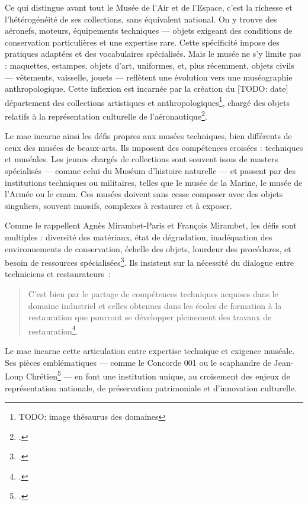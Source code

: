 Ce qui distingue avant tout le Musée de l’Air et de l’Espace, c’est la richesse et l’hétérogénéité de ses collections, sans équivalent national. On y trouve des aéronefs, moteurs, équipements techniques — objets exigeant des conditions de conservation particulières et une expertise rare. Cette spécificité impose des pratiques adaptées et des vocabulaires spécialisés. Mais le musée ne s’y limite pas : maquettes, estampes, objets d’art, uniformes, et, plus récemment, objets civils — vêtements, vaisselle, jouets — reflètent une évolution vers une muséographie anthropologique. Cette inflexion est incarnée par la création du [TODO: date] département des collections artistiques et anthropologiques\footnote{TODO: image thésaurus des domaines}, chargé des objets relatifs à la représentation culturelle de l’aéronautique\footcite{collectifMuseeLairLespace2023}.

Le \ac{mae} incarne ainsi les défis propres aux musées techniques, bien différents de ceux des musées de beaux-arts. Ils imposent des compétences croisées : techniques et muséales. Les jeunes chargés de collections sont souvent issus de masters spécialisés — comme celui du Muséum d’histoire naturelle — et passent par des institutions techniques ou militaires, telles que le musée de la Marine, le musée de l’Armée ou le \ac{cnam}. Ces musées doivent sans cesse composer avec des objets singuliers, souvent massifs, complexes à restaurer et à exposer.

Comme le rappellent Agnès Mirambet-Paris et François Mirambet, les défis sont multiples : diversité des matériaux, état de dégradation, inadéquation des environnements de conservation, échelle des objets, lourdeur des procédures, et besoin de ressources spécialisées\footcite{mirambet-parisConservationrestaurationPatrimoineTechnique2011}. Ils insistent sur la nécessité du dialogue entre techniciens et restaurateurs :
\begin{quote}
	\og C’est bien par le partage de compétences techniques acquises dans le domaine industriel et celles obtenues dans les écoles de formation à la restauration que pourront se développer pleinement des travaux de restauration\footcite{mirambet-parisConservationrestaurationPatrimoineTechnique2011}.\fg
\end{quote}

Le \ac{mae} incarne cette articulation entre expertise technique et exigence muséale. Ses pièces emblématiques — comme le Concorde 001 ou le scaphandre de Jean-Loup Chrétien\footcite{champenoisTresorsMuseeLair} — en font une institution unique, au croisement des enjeux de représentation nationale, de préservation patrimoniale et d’innovation culturelle.

